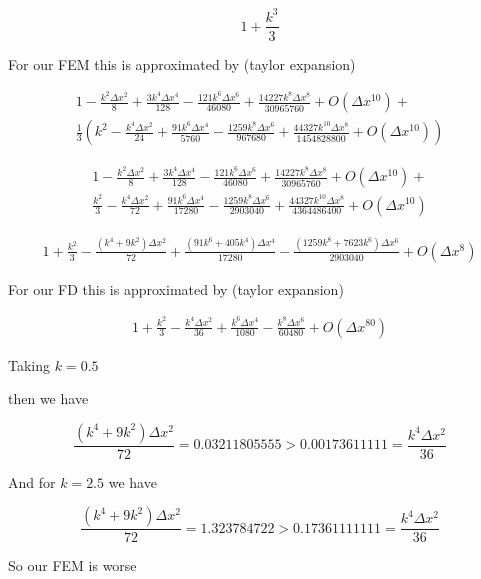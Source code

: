 \documentclass[12pt]{article}
\begin{document}
\[1 + \frac{k^3}{3}\]

For our FEM this is approximated by (taylor expansion)

\begin{multline}
1 - \frac{k^2 \Delta x^2}{8} + \frac{3k^4 \Delta x^4}{128} - \frac{121 k^{6} \Delta x^{6}}{46080} + \frac{14227k^{8} \Delta x^{8}}{30965760} + O(\Delta x^{10}) + \\
\frac{1}{3}\left(k^2 - \frac{k^4 \Delta x^2}{24} + \frac{91k^6 \Delta x^4}{5760} - \frac{1259k^{8} \Delta x^{6}}{967680} + \frac{44327k^{10} \Delta x^{8}}{1454828800} + O(\Delta x^{10})\right)
\end{multline}

\begin{multline}
1 - \frac{k^2 \Delta x^2}{8} + \frac{3k^4 \Delta x^4}{128} - \frac{121 k^{6} \Delta x^{6}}{46080} + \frac{14227k^{8} \Delta x^{8}}{30965760} + O(\Delta x^{10}) + \\
\frac{k^2}{3} - \frac{k^4 \Delta x^2}{72} + \frac{91k^6 \Delta x^4}{17280} - \frac{1259k^{8} \Delta x^{6}}{2903040} + \frac{44327k^{10} \Delta x^{8}}{4364486400} + O(\Delta x^{10})
\end{multline}

\begin{multline}
1 + \frac{k^2}{3} - \frac{ (k^4+9k^2) \Delta x^2}{72} + \frac{(91k^6 + 405k^4) \Delta x^4}{17280} - \frac{(1259k^{8} + 7623 k^{6}) \Delta x^{6}}{2903040}  + O(\Delta x^{8})
\end{multline}

For our FD this is approximated by (taylor expansion)


\begin{multline}
1 + \frac{k^2}{3} - \frac{k^4 \Delta x^2}{36} + \frac{k^6 \Delta x^4}{1080} - \frac{k^8 \Delta x^6}{60480} + O(\Delta x^{80})
\end{multline}

Taking $k = 0.5$

then we have 

\[\frac{ (k^4+9k^2) \Delta x^2}{72} = 0.03211805555 > 0.00173611111 = \frac{k^4 \Delta x^2}{36} \]

And for $k = 2.5$ we have 

\[\frac{ (k^4+9k^2) \Delta x^2}{72} = 1.323784722 > 0.17361111111 = \frac{k^4 \Delta x^2}{36} \]

So our FEM is worse
\end{document}
